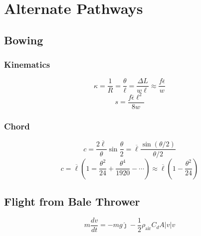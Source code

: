 \section{Alternate Pathways}
\subsection{Bowing}
\subsubsection{Kinematics}
\[
\kappa=\frac{1}{R}=\frac{\theta}{\ell}=\frac{\Delta L}{w\ell}\approx\frac{f\overline{\epsilon}}{w}
\]
\[
s=\frac{f\overline{\epsilon}\ell^2}{8w}
\]
\subsubsection{Chord}
\[
c=\frac{2\overline{\ell}}{\theta}\sin\frac{\theta}{2}=\overline{\ell}\frac{\sin(\theta/2)}{\theta/2}
\]
\[
c=\overline{\ell}\left(1=\frac{\theta^2}{24}+\frac{\theta^4}{1920}-\cdots\right)\approx\overline{\ell}\left(1-\frac{\theta^2}{24}\right)
\]

\subsection{Flight from Bale Thrower}
\[
m\frac{dv}{dt}=-mg\hat{\jmath}-\frac{1}{2}\rho_{\text{air}}C_dA|v|v
\]